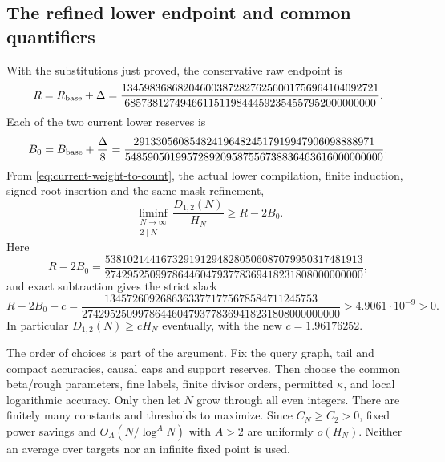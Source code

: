 \subsection{The refined lower endpoint and common quantifiers}

With the substitutions just proved, the conservative raw endpoint is
\begin{equation}
 R=R_{\rm base}+\Delta
  =\frac{1345983686820460038728276256001756964104092721}
        {685738127494661151198444592354557952000000000}.
 \label{eq:current-R}
\end{equation}
Each of the two current lower reserves is
\begin{equation}
 B_0=B_{\rm base}+\frac{\Delta}{8}
 =\frac{2913305608548241964824517919947906098888971}
       {5485905019957289209587556738836463616000000000}.
 \label{eq:current-B}
\end{equation}
From \eqref{eq:current-weight-to-count}, the actual lower compilation,
finite induction, signed root insertion and the same-mask refinement,
\begin{equation}
 \liminf_{\substack{N\to\infty\\2\mid N}}
         \frac{D_{1,2}(N)}{H_N}\ge R-2B_0.
 \label{eq:current-lower-derived}
\end{equation}
Here
\begin{equation}
 R-2B_0
 =\frac{5381021441673291912948280506087079950317481913}
       {2742952509978644604793778369418231808000000000},
 \label{eq:current-after-budgets}
\end{equation}
and exact subtraction gives the strict slack
\begin{equation}
 R-2B_0-c
 =\frac{13457260926863633771775678584711245753}
       {2742952509978644604793778369418231808000000000}
       >4.9061\cdot10^{-9}>0.
 \label{eq:current-lower-slack}
\end{equation}
In particular $D_{1,2}(N)\ge cH_N$ eventually, with the new
$c=1.96176252$.

The order of choices is part of the argument.  Fix the query graph,
tail and compact accuracies, causal caps and support reserves.  Then
choose the common beta/rough parameters, fine labels, finite divisor
orders, permitted $\kappa$, and local logarithmic accuracy.  Only
then let $N$ grow through all even integers.  There are finitely many
constants and thresholds to maximize.  Since $C_N\ge C_2>0$,
fixed power savings and $O_A(N/\log^AN)$ with $A>2$ are uniformly
$o(H_N)$.  Neither an average over targets nor an infinite fixed
point is used.

